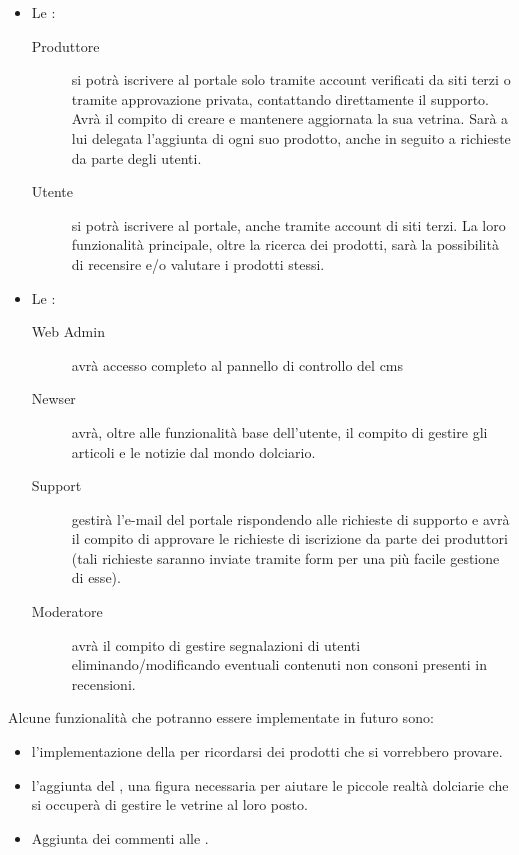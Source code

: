 \begin{itemize}
	\item Le :
		\begin{description}
			\item[Produttore] si potrà iscrivere al portale solo tramite account verificati da siti terzi o tramite approvazione privata, contattando direttamente il supporto. Avrà il compito di creare e mantenere aggiornata la sua vetrina. Sarà a lui delegata l’aggiunta di ogni suo prodotto, anche in seguito a richieste da parte degli utenti.
			
			\item[Utente] si potrà iscrivere al portale, anche tramite account di siti terzi. La loro funzionalità principale, oltre la ricerca dei prodotti, sarà la possibilità di recensire e/o valutare i prodotti stessi. 
		\end{description}
	\item Le :
		\begin{description}
			\item[Web Admin] avrà accesso completo al pannello di controllo del \gls{cms}
			
			\item[Newser] avrà, oltre alle funzionalità base dell’utente, il compito di gestire gli articoli e le notizie dal mondo dolciario.
			
			\item[Support] gestirà l’e-mail del portale rispondendo alle richieste di supporto e avrà il compito di approvare le richieste di iscrizione da parte dei produttori (tali richieste saranno inviate tramite form per una più facile gestione di esse).
			
			\item[Moderatore] avrà il compito di gestire segnalazioni di utenti eliminando/modificando eventuali contenuti non consoni presenti in recensioni.
		\end{description}
\end{itemize}

\noindent
Alcune funzionalità che potranno essere implementate in futuro sono: 
\begin{itemize}
	\item l’implementazione della  per ricordarsi dei prodotti che si vorrebbero provare.

	\item l’aggiunta del , una figura necessaria per aiutare le piccole realtà dolciarie che si occuperà di gestire le vetrine al loro posto.

	\item Aggiunta dei commenti alle .
\end{itemize}

